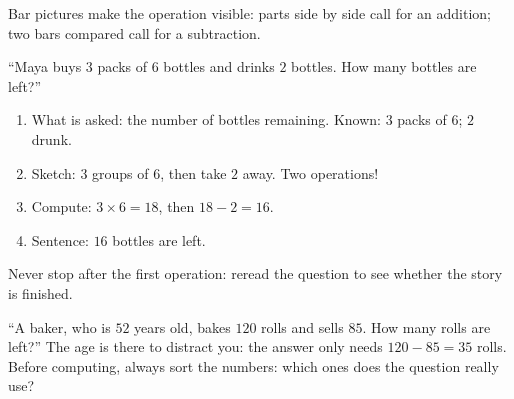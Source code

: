 \begin{omfigure}

{\small Bar pictures make the operation visible: parts side by side
call for an addition; two bars compared call for a subtraction.}
\end{omfigure}

\begin{example}\label{ex:g3:problems:twostep}
``Maya buys $3$ packs of $6$ bottles and drinks $2$ bottles. How many
bottles are left?''
\begin{enumerate}
  \item What is asked: the number of bottles remaining. Known: $3$
        packs of $6$; $2$ drunk.
  \item Sketch: $3$ groups of $6$, then take $2$ away. Two
        operations!
  \item Compute: $3 \times 6 = 18$, then $18 - 2 = 16$.
  \item Sentence: $16$ bottles are left.
\end{enumerate}
Never stop after the first operation: reread the question to see
whether the story is finished.
\end{example}

\begin{example}\label{ex:g3:problems:trap}
``A baker, who is $52$ years old, bakes $120$ rolls and sells $85$.
How many rolls are left?'' The age is there to distract you: the
answer only needs $120 - 85 = 35$ rolls. Before computing, always
sort the numbers: which ones does the question really use?
\end{example}

